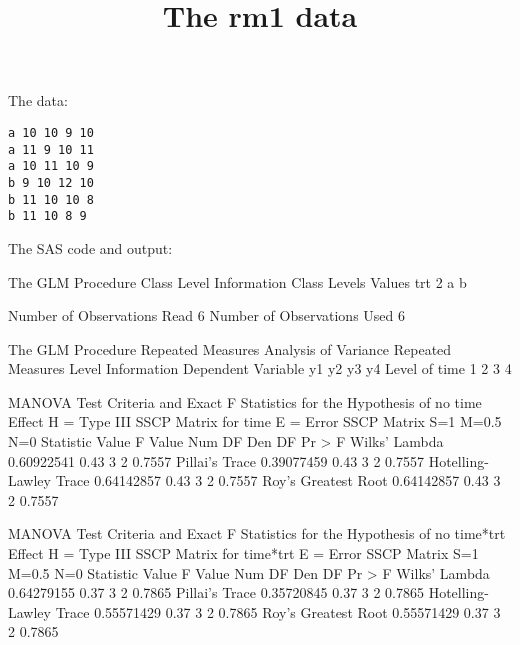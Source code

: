 \documentclass{article}
\title{The rm1 data}
\begin{document}
\maketitle
The data:
\begin{verbatim}
a 10 10 9 10
a 11 9 10 11
a 10 11 10 9
b 9 10 12 10
b 11 10 10 8
b 11 10 8 9
\end{verbatim}
The SAS code and output:
\begin{Woutput}
The GLM Procedure
   Class Level Information
Class         Levels    Values
trt                2    a b

Number of Observations Read           6
Number of Observations Used           6

The GLM Procedure
Repeated Measures Analysis of Variance
           Repeated Measures Level Information
Dependent Variable          y1       y2       y3       y4
     Level of time           1        2        3        4

                MANOVA Test Criteria and Exact F Statistics
                   for the Hypothesis of no time Effect
                     H = Type III SSCP Matrix for time
                           E = Error SSCP Matrix
                            S=1    M=0.5    N=0
Statistic                       Value   F Value   Num DF   Den DF   Pr > F
Wilks' Lambda              0.60922541      0.43        3        2   0.7557
Pillai's Trace             0.39077459      0.43        3        2   0.7557
Hotelling-Lawley Trace     0.64142857      0.43        3        2   0.7557
Roy's Greatest Root        0.64142857      0.43        3        2   0.7557

                MANOVA Test Criteria and Exact F Statistics
                 for the Hypothesis of no time*trt Effect
                   H = Type III SSCP Matrix for time*trt
                           E = Error SSCP Matrix
                            S=1    M=0.5    N=0
Statistic                       Value   F Value   Num DF   Den DF   Pr > F
Wilks' Lambda              0.64279155      0.37        3        2   0.7865
Pillai's Trace             0.35720845      0.37        3        2   0.7865
Hotelling-Lawley Trace     0.55571429      0.37        3        2   0.7865
Roy's Greatest Root        0.55571429      0.37        3        2   0.7865


\end{Woutput}
\end{document}
